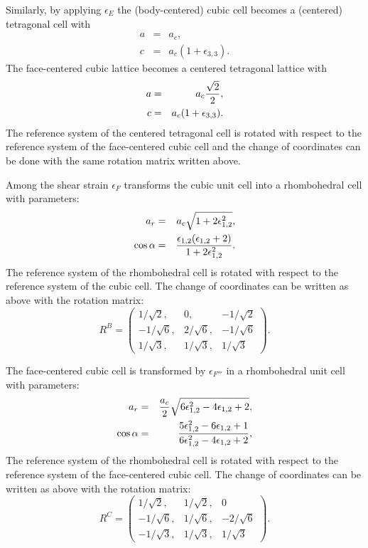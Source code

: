 \documentclass[12pt,a4paper]{article}
\begin{document}
Similarly, by applying $\epsilon_E$ the (body-centered) cubic
cell becomes a (centered) tetragonal cell with
\begin{eqnarray}
a&=&a_c,   \\
c&=&a_c (1+\epsilon_{3,3}).
\end{eqnarray}
The face-centered cubic lattice becomes a centered tetragonal lattice with
\begin{eqnarray}
a&=&a_c {\sqrt{2}\over 2},   \\
c&=&a_c (1+\epsilon_{3,3}).
\end{eqnarray}
The reference system of the centered tetragonal
cell is rotated with respect to the reference system of the face-centered
cubic cell and the change of coordinates can be done with the same rotation 
matrix written above.

Among the shear strain $\epsilon_F$
transforms the cubic unit cell into a rhombohedral cell with
parameters:
\begin{eqnarray}
a_r&=& a_c \sqrt{1+2\epsilon_{1,2}^2}, \\
\cos\alpha &=& {\epsilon_{1,2} (\epsilon_{1,2} + 2) \over 
1 + 2 \epsilon_{1,2}^2 }.
\end{eqnarray}
The reference system of the rhombohedral cell is rotated with respect to
the reference system of the cubic cell. The change of coordinates can
be written as above with the rotation matrix:
\begin{equation}
R^B=\left( \begin{array}{ccc}
1/\sqrt{2}, & 0, & -1/\sqrt{2}
\\
-1/\sqrt{6}, & 2/\sqrt{6}, & -1/\sqrt{6}
\\
1/\sqrt{3}, & 1/\sqrt{3}, & 1/\sqrt{3}
\end{array}
\right).
\end{equation}

The face-centered cubic cell is transformed by $\epsilon_{F'''}$
in a rhombohedral unit cell with parameters:
\begin{eqnarray}
a_r&=& {a_c \over 2} \sqrt{6 \epsilon_{1,2}^2-4 \epsilon_{1,2} +2}, \\
\cos\alpha &=& {5\epsilon_{1,2}^2- 6\epsilon_{1,2} + 1 \over 
6\epsilon_{1,2}^2 - 4\epsilon_{1,2}+2 },
\end{eqnarray}
The reference system of the rhombohedral cell is rotated with respect to
the reference system of the face-centered cubic cell. 
The change of coordinates can be written as above with the rotation matrix:
\begin{equation}
R^C=\left( \begin{array}{ccc}
1/\sqrt{2}, & 1/\sqrt{2}, & 0 \\
-1/\sqrt{6}, & 1/\sqrt{6}, & -2/\sqrt{6}
\\
-1/\sqrt{3}, & 1/\sqrt{3}, & 1/\sqrt{3}
\end{array}
\right).
\end{equation}
\end{document}
